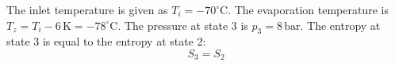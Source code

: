 The inlet temperature is given as \( T_i = -70^\circ\text{C} \).  
The evaporation temperature is \( T_z = T_i - 6 \, \text{K} = -78^\circ\text{C} \).  
The pressure at state 3 is \( p_3 = 8 \, \text{bar} \).  
The entropy at state 3 is equal to the entropy at state 2:  
\[
S_3 = S_2
\]